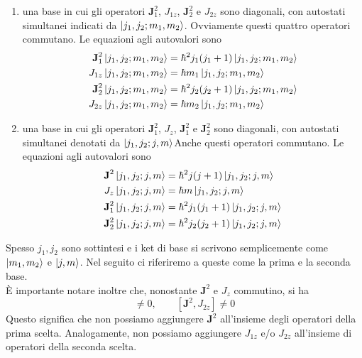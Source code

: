 \begin{enumerate}

\item una base in cui gli operatori $\textbf{J}_1^2$, $J_{1z}$, $\textbf{J}_2^2$ e $J_{2z}$ sono diagonali, con autostati simultanei indicati da $\ket{j_1,j_2;m_1,m_2}$. Ovviamente questi quattro operatori commutano. Le equazioni agli autovalori sono
\begin{subequations}
\label{eqn:base1}
\begin{align}
\textbf{J}_1^2\ket{j_1,j_2;m_1,m_2}&=\hbar^2 j_1(j_1+1)\ket{j_1,j_2;m_1,m_2} \\
J_{1z}\ket{j_1,j_2;m_1,m_2}&=\hbar m_1\ket{j_1,j_2;m_1,m_2} \\
\textbf{J}_2^2\ket{j_1,j_2;m_1,m_2}&=\hbar^2 j_2(j_2+1)\ket{j_1,j_2;m_1,m_2} \\
J_{2z}\ket{j_1,j_2;m_1,m_2}&=\hbar m_2\ket{j_1,j_2;m_1,m_2}
\end{align}
\end{subequations}
\item una base in cui gli operatori $\textbf{J}_1^2$, $J_z$, $\textbf{J}_1^2$ e $\textbf{J}_2^2$ sono diagonali, con autostati simultanei denotati da $\ket{j_1,j_2;j,m}$Anche questi operatori commutano. Le equazioni agli autovalori sono
\begin{subequations}
\label{eqn:base2}
\begin{align}
\textbf{J}^2\ket{j_1,j_2;j,m}&=\hbar^2 j(j+1)\ket{j_1,j_2;j,m} \\
J_z\ket{j_1,j_2;j,m}&=\hbar m\ket{j_1,j_2;j,m} \\
\textbf{J}_1^2\ket{j_1,j_2;j,m}&=\hbar^2 j_1(j_1+1)\ket{j_1,j_2;j,m} \\
\textbf{J}_2^2\ket{j_1,j_2;j,m}&=\hbar^2 j_2(j_2+1)\ket{j_1,j_2;j,m}
\end{align}
\end{subequations}

\end{enumerate}
Spesso $j_1,j_2$ sono sottintesi e i ket di base si scrivono semplicemente come $\ket{m_1,m_2}$ e $\ket{j,m}$. Nel seguito ci riferiremo a queste come la prima e la seconda base. \\ È importante notare inoltre che, nonostante $\textbf{J}^2$ e $J_z$ commutino, si ha
\begin{equation}
[\textbf{J}^2,J_{1z}]\neq0,\qquad [\textbf{J}^2,J_{2z}]\neq0
\end{equation}
Questo significa che non possiamo aggiungere $\textbf{J}^2$ all'insieme degli operatori della prima scelta. Analogamente, non possiamo aggiungere $J_{1z}$ e/o $J_{2z}$ all'insieme di operatori della seconda scelta.

